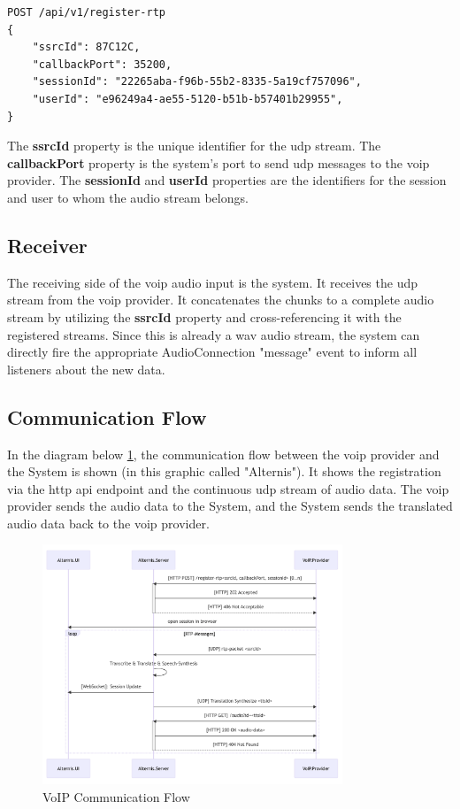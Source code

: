 \begin{verbatim}
POST /api/v1/register-rtp
{
    "ssrcId": 87C12C,
    "callbackPort": 35200,
    "sessionId": "22265aba-f96b-55b2-8335-5a19cf757096",
    "userId": "e96249a4-ae55-5120-b51b-b57401b29955",
}
\end{verbatim}

The \textbf{ssrcId} property is the unique identifier for the \ac{udp} stream. The \textbf{callbackPort} property is 
the system's port to send \ac{udp} messages to the \ac{voip} provider. The \textbf{sessionId} and \textbf{userId} 
properties are the identifiers for the session and user to whom the audio stream belongs.

\subsection{Receiver}

The receiving side of the \ac{voip} audio input is the system. It receives the \ac{udp} stream from the \ac{voip} 
provider. It concatenates the chunks to a complete audio stream by utilizing the \textbf{ssrcId} property and 
cross-referencing it with the registered streams. Since this is already a \ac{wav} audio stream, the system can 
directly fire the appropriate AudioConnection "message" event to inform all listeners about the new data.

\subsection{Communication Flow}

In the diagram below \ref{fig:voip-communication-flow}, the communication flow between the \ac{voip} provider and the 
System is shown (in this graphic called "Alternis"). It shows the registration via the \ac{http} \ac{api} endpoint and 
the continuous \ac{udp} stream of audio data. The \ac{voip} provider sends the audio data to the System, and the System 
sends the translated audio data back to the \ac{voip} provider. 

\begin{figure}[ht]
	\centering
	\includegraphics[width=0.8\textwidth]{Figures/voip-communication-flow.png}
	\caption{VoIP Communication Flow}
	\label{fig:voip-communication-flow}
\end{figure}
